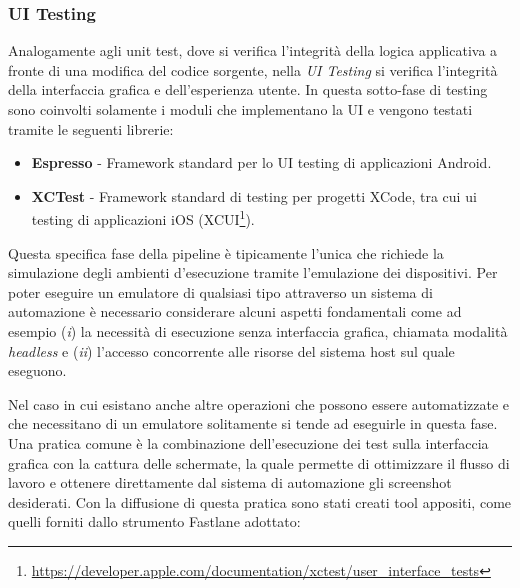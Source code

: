 \subsubsection*{UI Testing}
Analogamente agli unit test, dove si verifica l'integrità della logica applicativa a fronte di una modifica del codice sorgente, nella \textit{UI Testing} si verifica l'integrità della interfaccia grafica e dell'esperienza utente. In questa sotto-fase di testing sono coinvolti solamente i moduli che implementano la UI e vengono testati tramite le seguenti librerie:

\begin{itemize}
    \item \textbf{Espresso} - Framework standard per lo UI testing di applicazioni Android.
    \item \textbf{XCTest} - Framework standard di testing per progetti XCode, tra cui ui testing di applicazioni iOS (XCUI\footnote{\href{https://developer.apple.com/documentation/xctest/user\_interface\_tests}{https://developer.apple.com/documentation/xctest/user\_interface\_tests}}).
\end{itemize}

Questa specifica fase della pipeline è tipicamente l'unica che richiede la simulazione degli ambienti d'esecuzione tramite l'emulazione dei dispositivi. Per poter eseguire un emulatore di qualsiasi tipo attraverso un sistema di automazione è necessario considerare alcuni aspetti fondamentali come ad esempio (\textit{i}) la necessità di esecuzione senza interfaccia grafica, chiamata modalità \textit{headless} e (\textit{ii}) l'accesso concorrente alle risorse del sistema host sul quale eseguono. 

Nel caso in cui esistano anche altre operazioni che possono essere automatizzate e che necessitano di un emulatore solitamente si tende ad eseguirle in questa fase. Una pratica comune è la combinazione dell'esecuzione dei test sulla interfaccia grafica con la cattura delle schermate, la quale permette di ottimizzare il flusso di lavoro e ottenere direttamente dal sistema di automazione gli screenshot desiderati. Con la diffusione di questa pratica sono stati creati tool appositi, come quelli forniti dallo strumento Fastlane adottato:

